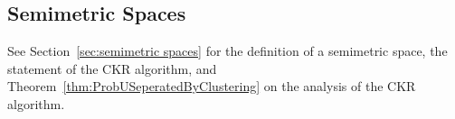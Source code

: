   
  \subsection{Semimetric Spaces}
  See Section~\ref{sec:semimetric spaces} for the definition of a semimetric space, the statement of the CKR algorithm, and 
  Theorem~\ref{thm:ProbUSeperatedByClustering} on the analysis of the CKR algorithm.
  
  
  
